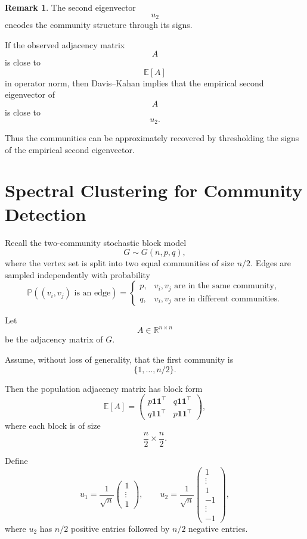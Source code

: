 \documentclass[12pt,oneside]{book}
\numberwithin{equation}{section}
\theoremstyle{definition}
\newtheorem{remark}{Remark}[section]
\theoremstyle{plain}
\theoremstyle{remark}
\newcommand{\R}{\mathbb{R}}
\newcommand{\E}{\mathbb{E}}
\newcommand{\Prob}{\mathbb{P}}
\begin{document}
\begin{remark}
The second eigenvector
\[
u_2
\]
encodes the community structure through its signs.

If the observed adjacency matrix
\[
A
\]
is close to
\[
\E[A]
\]
in operator norm, then Davis--Kahan implies that the empirical second eigenvector of
\[
A
\]
is close to
\[
u_2.
\]

Thus the communities can be approximately recovered by thresholding the signs of the empirical second eigenvector.
\end{remark}

\section{Spectral Clustering for Community Detection}

Recall the two-community stochastic block model
\[
G\sim G(n,p,q),
\]
where the vertex set is split into two equal communities of size $n/2$. Edges are sampled independently with probability
\[
\Prob((v_i,v_j)\text{ is an edge})
=
\begin{cases}
p, & v_i,v_j \text{ are in the same community},\\
q, & v_i,v_j \text{ are in different communities}.
\end{cases}
\]

Let
\[
A\in\R^{n\times n}
\]
be the adjacency matrix of $G$.

Assume, without loss of generality, that the first community is
\[
\{1,\dots,n/2\}.
\]

Then the population adjacency matrix has block form
\[
\E[A]
=
\begin{pmatrix}
p\mathbf{1}\mathbf{1}^\top & q\mathbf{1}\mathbf{1}^\top\\
q\mathbf{1}\mathbf{1}^\top & p\mathbf{1}\mathbf{1}^\top
\end{pmatrix},
\]
where each block is of size
\[
\frac{n}{2}\times \frac{n}{2}.
\]

Define
\[
u_1
=
\frac{1}{\sqrt{n}}
\begin{pmatrix}
1\\
\vdots\\
1
\end{pmatrix},
\qquad
u_2
=
\frac{1}{\sqrt{n}}
\begin{pmatrix}
1\\
\vdots\\
1\\
-1\\
\vdots\\
-1
\end{pmatrix},
\]
where $u_2$ has $n/2$ positive entries followed by $n/2$ negative entries.
\end{document}
